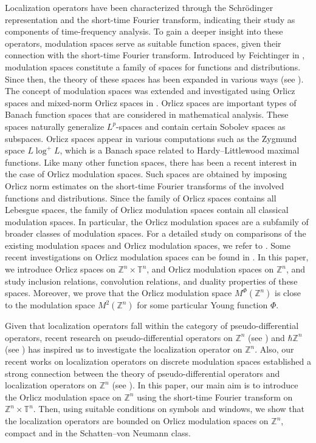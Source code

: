 \documentclass[a4paper,11pt, reqno]{amsart}
\theoremstyle{plain}
\theoremstyle{definition}
\theoremstyle{remark}
\def \Z{{\mathbb Z}}
\def \T{{\mathbb T}}
\begin{document}
Localization operators have been characterized through the Schr\"odinger representation and the short-time Fourier transform, indicating their study as components of time-frequency analysis. To gain a deeper insight into these operators, modulation spaces serve as suitable function spaces, given their connection with the short-time Fourier transform. Introduced by Feichtinger in \cite{fei03}, modulation spaces constitute a family of spaces for functions and distributions. Since then, the theory of these spaces has been expanded in various ways (see \cite{gro01}). The concept of modulation spaces was extended and investigated using Orlicz spaces and mixed-norm Orlicz spaces in \cite{sch13}. Orlicz spaces are important types of Banach function spaces that are considered in mathematical analysis. These spaces naturally generalize $L^p$-spaces and contain certain Sobolev spaces as subspaces. Orlicz spaces appear in various computations such as the Zygmund space $L \log^+ L$, which is a Banach space related to Hardy--Littlewood maximal functions. Like many other function spaces, there has been a recent interest in the case of Orlicz modulation spaces. Such spaces are obtained by imposing Orlicz norm estimates on the short-time Fourier transforms of the involved functions and distributions. Since the family of Orlicz spaces contains all Lebesgue spaces, the family of Orlicz modulation spaces contain all classical modulation spaces. In particular, the Orlicz modulation spaces are a subfamily of broader classes of modulation spaces. For a detailed study on comparisons of the existing modulation spaces and Orlicz modulation spaces, we refer to \cite{gum24}. Some recent investigations on Orlicz modulation spaces can be found in \cite{sch13, tof22}. In this paper, we introduce Orlicz spaces on $\Z^n \times \T^n$, and Orlicz modulation spaces on $\Z^n$, and study inclusion relations, convolution relations, and duality properties of these spaces. Moreover, we prove that the Orlicz modulation space $M^{\Phi}(\Z^n)$ is close to the modulation space $M^{2}(\Z^n)$ for some particular Young function $\Phi$.

Given that localization operators fall within the category of pseudo-differential operators, recent research on pseudo-differential operators on $\Z^n$ (see \cite{ bot20}) and $\hbar \Z^n$ (see \cite{bot24}) has inspired us to investigate the localization operator on $\Z^n$. Also, our recent works on localization operators on discrete modulation spaces established a strong connection between the theory of pseudo-differential operators and localization operators on $\Z^n$ (see \cite{das23}). In this paper, our main aim is to introduce the Orlicz modulation space on $\Z^n$ using the short-time Fourier transform on $\Z^n \times \T^n$. Then, using suitable conditions on symbols and windows, we show that the localization operators are bounded on Orlicz modulation spaces on $\mathbb Z^n$, compact and in the Schatten--von Neumann class.
\end{document}
